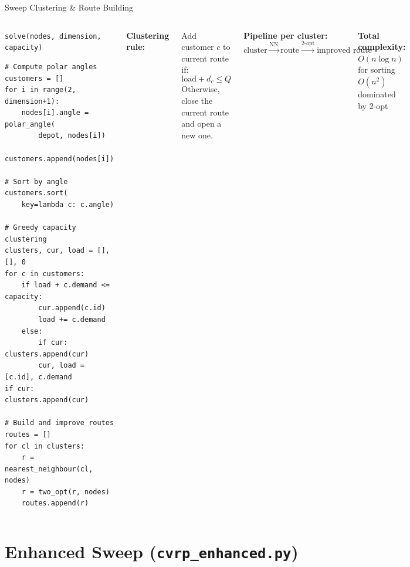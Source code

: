 \documentclass{beamer}
\begin{document}
\begin{frame}[fragile,shrink=10]{Sweep Clustering \& Route Building}

\begin{columns}[T]

\begin{block}{\texttt{solve(nodes, dimension, capacity)}}
\begin{lstlisting}
# Compute polar angles
customers = []
for i in range(2, dimension+1):
    nodes[i].angle = polar_angle(
        depot, nodes[i])
    customers.append(nodes[i])

# Sort by angle
customers.sort(
    key=lambda c: c.angle)

# Greedy capacity clustering
clusters, cur, load = [], [], 0
for c in customers:
    if load + c.demand <= capacity:
        cur.append(c.id)
        load += c.demand
    else:
        if cur: clusters.append(cur)
        cur, load = [c.id], c.demand
if cur: clusters.append(cur)

# Build and improve routes
routes = []
for cl in clusters:
    r = nearest_neighbour(cl, nodes)
    r = two_opt(r, nodes)
    routes.append(r)
\end{lstlisting}
\end{block}

\small
\textbf{Clustering rule:}

Add customer $c$ to current route if:
\[
  \text{load} + d_c \leq Q
\]
Otherwise, close the current route and open a new one.

\vspace{0.5em}
\textbf{Pipeline per cluster:}
\[
  \text{cluster} \xrightarrow{\text{NN}} \text{route}
                 \xrightarrow{\text{2-opt}} \text{improved route}
\]

\vspace{0.4em}
\textbf{Total complexity:}\\
$O(n \log n)$ for sorting\\
$O(n^2)$ dominated by 2-opt\\
\end{columns}

\end{frame}

\section{Enhanced Sweep (\texttt{cvrp\_enhanced.py})}
\end{document}
